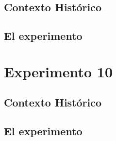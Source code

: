 \documentclass[journal]{IEEEtran}
\begin{document}
\subsection{Contexto Histórico}

\subsection{El experimento}








\section{Experimento 10}

\subsection{Contexto Histórico}

\subsection{El experimento}











%
\end{document}
